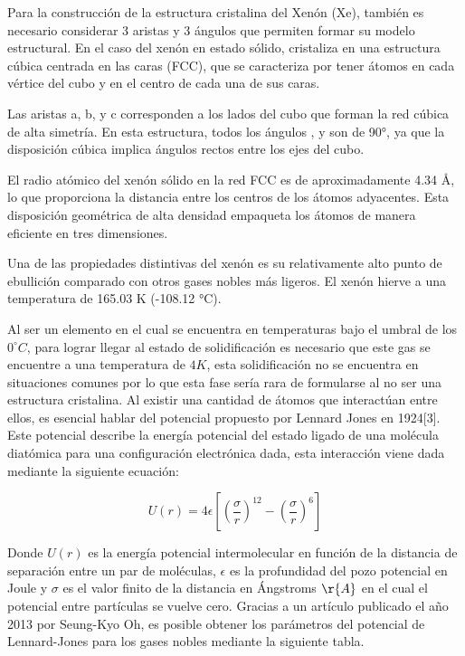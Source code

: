 \documentclass[10pt,letterpaper,twocolumn]{article}
\begin{document}
Para la construcción de la estructura cristalina del Xenón (Xe), también es necesario considerar 3 aristas y 3 ángulos que permiten formar su modelo estructural. En el caso del xenón en estado sólido, cristaliza en una estructura cúbica centrada en las caras (FCC), que se caracteriza por tener átomos en cada vértice del cubo y en el centro de cada una de sus caras.

Las aristas a, b, y c corresponden a los lados del cubo que forman la red cúbica de alta simetría. En esta estructura, todos los ángulos \si{\alpha}, \si{\beta} y \si{\gamma} son de 90°, ya que la disposición cúbica implica ángulos rectos entre los ejes del cubo.

El radio atómico del xenón sólido en la red FCC es de aproximadamente 4.34 Å, lo que proporciona la distancia entre los centros de los átomos adyacentes. Esta disposición geométrica de alta densidad empaqueta los átomos de manera eficiente en tres dimensiones.

Una de las propiedades distintivas del xenón es su relativamente alto punto de ebullición comparado con otros gases nobles más ligeros. El xenón hierve a una temperatura de 165.03 K (-108.12 °C).

Al ser un elemento en el cual se encuentra en temperaturas bajo el umbral de los $0^{\circ}C$, para lograr llegar al estado de solidificación es necesario que este gas se encuentre a una temperatura de $4K$, esta solidificación no se encuentra en situaciones comunes por lo
que esta fase sería rara de formularse al no ser una estructura cristalina.
Al existir una cantidad de átomos que interactúan entre ellos, es esencial hablar del potencial propuesto por Lennard Jones en 1924[3]. Este potencial describe la energía potencial del estado ligado de una molécula diatómica para una configuración electrónica dada, esta interacción viene dada mediante la siguiente ecuación:

\begin{equation}
    U(r)=4\epsilon[(\dfrac{\sigma}{r})^{12} - (\dfrac{\sigma}{r})^{6}]
\end{equation}

Donde $U(r)$ es la energía potencial intermolecular en función de la distancia de separación entre un par de moléculas, $\epsilon$ es la profundidad del pozo potencial en Joule y $\sigma$ es el valor finito de la distancia en Ángstroms $\r{A}$ en el cual el potencial entre partículas se vuelve cero.
Gracias a un artículo publicado el año 2013 por Seung-Kyo Oh, es posible
obtener los parámetros del potencial de Lennard-Jones para los gases nobles
mediante la siguiente tabla.
\end{document}
